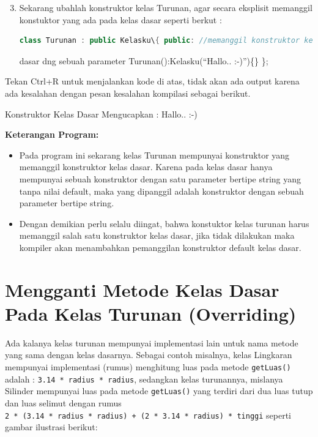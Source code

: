\begin{enumerate}

\setcounter{enumi}{2}
\item
  Sekarang ubahlah konstruktor kelas Turunan, agar secara eksplisit
  memanggil konstuktor yang ada pada kelas dasar seperti berkut :
\begin{lstlisting}[language=c++, numbers=none]
class Turunan : public Kelasku\{ public: //memanggil konstruktor kelas
\end{lstlisting}
  
  dasar dng sebuah parameter Turunan():Kelasku(``Hallo.. :-)'')\{\} \};
\end{enumerate}

Tekan Ctrl+R untuk menjalankan kode di atas, tidak akan ada output
karena ada kesalahan dengan pesan kesalahan kompilasi sebagai berikut.

\begin{lcverbatim}
Konstruktor Kelas Dasar 
Mengucapkan : Hallo.. :-)
\end{lcverbatim}
 

\textbf{Keterangan Program:}

\begin{itemize}

\item
  Pada program ini sekarang kelas Turunan mempunyai konstruktor yang
  memanggil konstruktor kelas dasar. Karena pada kelas dasar hanya
  mempunyai sebuah konstruktor dengan satu parameter bertipe string yang
  tanpa nilai default, maka yang dipanggil adalah konstruktor dengan
  sebuah parameter bertipe string.
\item
  Dengan demikian perlu selalu diingat, bahwa konstuktor kelas turunan
  harus memanggil salah satu konstruktor kelas dasar, jika tidak
  dilakukan maka kompiler akan menambahkan pemanggilan konstruktor
  default kelas dasar.
\end{itemize}

\section{Mengganti Metode Kelas Dasar Pada Kelas Turunan
(Overriding)}\label{mengganti-metode-kelas-dasar-pada-kelas-turunan-overriding}

Ada kalanya kelas turunan mempunyai implementasi lain untuk nama metode
yang sama dengan kelas dasarnya. Sebagai contoh misalnya, kelas
Lingkaran mempunyai implementasi (rumus) menghitung luas pada metode
\texttt{getLuas()} adalah : \texttt{3.14\ *\ radius\ *\ radius},
sedangkan kelas turunannya, mislanya Silinder mempunyai luas pada metode
\texttt{getLuas()} yang terdiri dari dua luas tutup dan luas selimut
dengan rumus
\texttt{2\ *\ (3.14\ *\ radius\ *\ radius)\ +\ (2\ *\ 3.14\ *\ radius)\ *\ tinggi}
seperti gambar ilustrasi berikut:

